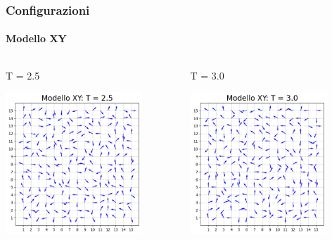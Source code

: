 \begin{frame}
    \frametitle{Configurazioni}
    \framesubtitle{Modello XY}

    \begin{columns}
        \begin{column}{0.5\textwidth}
            \begin{block}{T = 2.5}

            \centering
            \includegraphics[width=0.8\textwidth]{Immagini/simXY/conf_T2.5.png}

            \end{block}
        \end{column}
    
        \begin{column}{0.5\textwidth}
            \begin{block}{T = 3.0}

                \centering
                \includegraphics[width=0.8\textwidth]{Immagini/backupXY/conf_T3.0.png}


\end{block}
\end{column}
\end{columns}
\end{frame}
